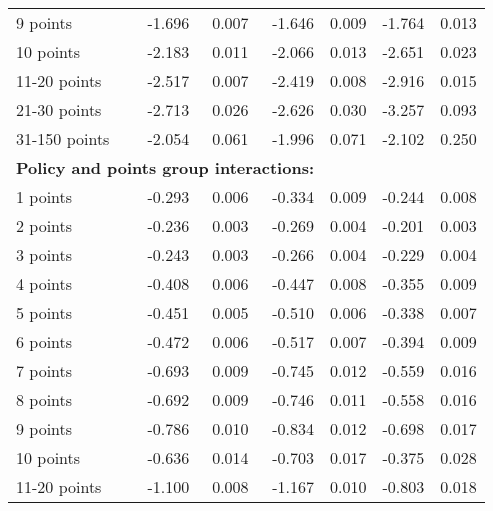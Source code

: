 \begin{table}
\begin{tabular}{l r r r r r r}
9 points  & -1.696  &  0.007  & -1.646  &  0.009  & -1.764  &  0.013   \\ 
 
10 points  & -2.183  &  0.011  & -2.066  &  0.013  & -2.651  &  0.023   \\ 
 
11-20 points  & -2.517  &  0.007  & -2.419  &  0.008  & -2.916  &  0.015   \\ 
 
21-30 points  & -2.713  &  0.026  & -2.626  &  0.030  & -3.257  &  0.093   \\ 
 
31-150 points  & -2.054  &  0.061  & -1.996  &  0.071  & -2.102  &  0.250   \\ 
 

\hline 
 
\multicolumn{4}{l}{\textbf{Policy and points group interactions:}}  \\ 
 
1 points  & -0.293  &  0.006  & -0.334  &  0.009  & -0.244  &  0.008   \\ 
 
2 points  & -0.236  &  0.003  & -0.269  &  0.004  & -0.201  &  0.003   \\ 
 
3 points  & -0.243  &  0.003  & -0.266  &  0.004  & -0.229  &  0.004   \\ 
 
4 points  & -0.408  &  0.006  & -0.447  &  0.008  & -0.355  &  0.009   \\ 
 
5 points  & -0.451  &  0.005  & -0.510  &  0.006  & -0.338  &  0.007   \\ 
 
6 points  & -0.472  &  0.006  & -0.517  &  0.007  & -0.394  &  0.009   \\ 
 
7 points  & -0.693  &  0.009  & -0.745  &  0.012  & -0.559  &  0.016   \\ 
 
8 points  & -0.692  &  0.009  & -0.746  &  0.011  & -0.558  &  0.016   \\ 
 
9 points  & -0.786  &  0.010  & -0.834  &  0.012  & -0.698  &  0.017   \\ 
 
10 points  & -0.636  &  0.014  & -0.703  &  0.017  & -0.375  &  0.028   \\ 
 
11-20 points  & -1.100  &  0.008  & -1.167  &  0.010  & -0.803  &  0.018   \\ 
 

\end{tabular}
\end{table}
